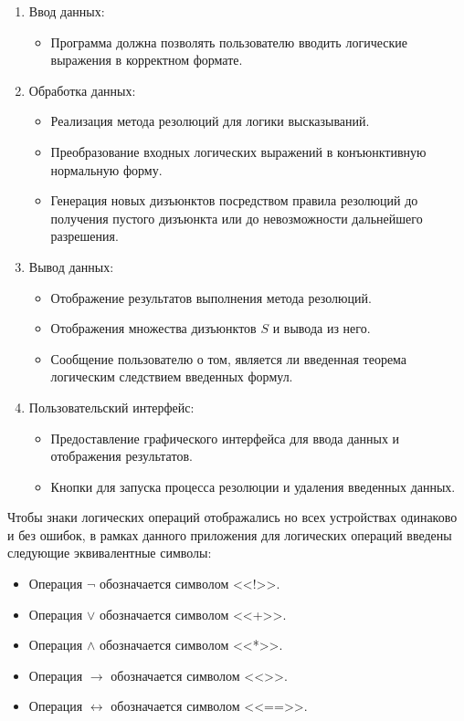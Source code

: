 \documentclass[12pt, a4paper]{article}
\begin{document}
	 \begin{enumerate}
	 	\item Ввод данных:
	 	\begin{itemize}
	 		\item Программа должна позволять пользователю вводить логические выражения в корректном формате.
	 	\end{itemize}
	 	\item Обработка данных:
	 	\begin{itemize}
	 		\item Реализация метода резолюций для логики высказываний.
	 		\item Преобразование входных логических выражений в конъюнктивную нормальную форму.
	 		\item Генерация новых дизъюнктов посредством правила резолюций до получения пустого дизъюнкта или до невозможности дальнейшего разрешения.
	 	\end{itemize}
	 	\item Вывод данных:
	 	\begin{itemize}
	 		\item Отображение результатов выполнения метода резолюций.
	 		\item Отображения множества дизъюнктов $S$ и вывода из него.
	 		\item Сообщение пользователю о том, является ли введенная теорема логическим следствием введенных формул.
	 	\end{itemize}
	 	\item Пользовательский интерфейс:
	 	\begin{itemize}
	 		\item Предоставление графического интерфейса для ввода данных и отображения результатов.
	 		\item Кнопки для запуска процесса резолюции и удаления введенных данных.
	 	\end{itemize}
	 \end{enumerate}
	 \par Чтобы знаки логических операций отображались но всех устройствах одинаково и без ошибок, в рамках данного приложения для логических операций введены следующие эквивалентные символы:
	 \begin{itemize}
	 	\item Операция $\neg$ обозначается символом <<!>>.
	 	\item Операция $\lor$ обозначается символом <<+>>.
	 	\item Операция $\land$ обозначается символом <<*>>.
	 	\item Операция $\rightarrow$ обозначается символом <<\text{->}>>.
	 	\item Операция $\leftrightarrow$ обозначается символом <<==>>.
	 \end{itemize}
\end{document}
